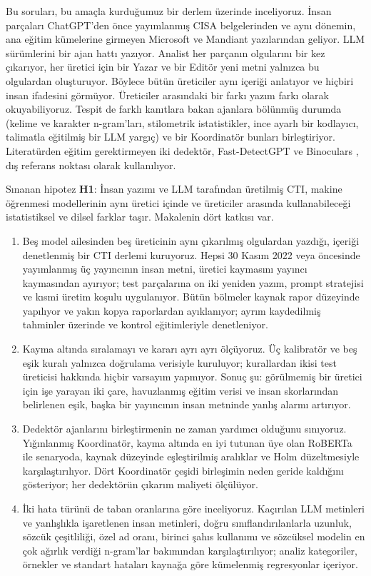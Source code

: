 \documentclass[journal]{IEEEtran}
\begin{document}
Bu soruları, bu amaçla kurduğumuz bir derlem üzerinde inceliyoruz. İnsan parçaları ChatGPT'den önce yayımlanmış
CISA belgelerinden ve aynı dönemin, ana eğitim kümelerine girmeyen Microsoft ve Mandiant yazılarından geliyor. LLM
sürümlerini bir ajan hattı yazıyor. Analist her parçanın olgularını bir kez çıkarıyor, her üretici için bir Yazar ve
bir Editör yeni metni yalnızca bu olgulardan oluşturuyor. Böylece bütün üreticiler aynı içeriği anlatıyor ve
hiçbiri insan ifadesini görmüyor. Üreticiler arasındaki bir farkı yazım farkı olarak okuyabiliyoruz. Tespit de
farklı kanıtlara bakan ajanlara bölünmüş durumda (kelime ve karakter n-gram'ları, stilometrik istatistikler, ince
ayarlı bir kodlayıcı, talimatla eğitilmiş bir LLM yargıç) ve bir Koordinatör bunları birleştiriyor. Literatürden
eğitim gerektirmeyen iki dedektör, Fast-DetectGPT \cite{Bao_2024} ve Binoculars \cite{Hans_2024}, dış referans
noktası olarak kullanılıyor.

Sınanan hipotez \textbf{H1}: İnsan yazımı ve LLM tarafından üretilmiş CTI, makine öğrenmesi modellerinin aynı
üretici içinde ve üreticiler arasında kullanabileceği istatistiksel ve dilsel farklar taşır. Makalenin dört katkısı
var.
\begin{enumerate}
\item Beş model ailesinden beş üreticinin aynı çıkarılmış olgulardan yazdığı, içeriği denetlenmiş bir CTI derlemi
kuruyoruz. Hepsi 30 Kasım 2022 veya öncesinde yayımlanmış üç yayıncının insan metni, üretici kaymasını yayıncı
kaymasından ayırıyor; test parçalarına on iki yeniden yazım, prompt stratejisi ve kısmi üretim koşulu uygulanıyor.
Bütün bölmeler kaynak rapor düzeyinde yapılıyor ve yakın kopya raporlardan ayıklanıyor; ayrım kaydedilmiş
tahminler üzerinde ve kontrol eğitimleriyle denetleniyor.
\item Kayma altında sıralamayı ve kararı ayrı ayrı ölçüyoruz. Üç kalibratör ve beş eşik kuralı yalnızca doğrulama
verisiyle kuruluyor; kurallardan ikisi test üreticisi hakkında hiçbir varsayım yapmıyor. Sonuç şu: görülmemiş bir
üretici için işe yarayan iki çare, havuzlanmış eğitim verisi ve insan skorlarından belirlenen eşik, başka bir
yayıncının insan metninde yanlış alarmı artırıyor.
\item Dedektör ajanlarını birleştirmenin ne zaman yardımcı olduğunu sınıyoruz. Yığınlanmış Koordinatör, kayma
altında en iyi tutunan üye olan RoBERTa ile \GapN{} senaryoda, kaynak düzeyinde eşleştirilmiş aralıklar ve Holm
düzeltmesiyle karşılaştırılıyor. Dört Koordinatör çeşidi birleşimin neden geride kaldığını gösteriyor; her
dedektörün çıkarım maliyeti ölçülüyor.
\item İki hata türünü de taban oranlarına göre inceliyoruz. Kaçırılan LLM metinleri ve yanlışlıkla işaretlenen insan
metinleri, doğru sınıflandırılanlarla uzunluk, sözcük çeşitliliği, özel ad oranı, birinci şahıs kullanımı ve
sözcüksel modelin en çok ağırlık verdiği n-gram'lar bakımından karşılaştırılıyor; analiz kategoriler, örnekler ve
standart hataları kaynağa göre kümelenmiş regresyonlar içeriyor.
\end{enumerate}
\end{document}
